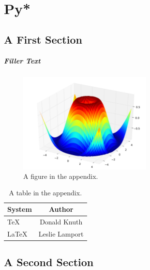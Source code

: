 \chapter{Py*}
\label{appendix:1}

\section{A First Section}

\paragraph{Filler Text} \lipsum[1-6]
%
\begin{figure}
  \centering
  \includegraphics[width=0.6\textwidth]{Chapter-2/figs/threed}
  \caption{A figure in the appendix.}
  \label{fig:app}
\end{figure}
%
\lipsum[7-10]
\begin{table}
  \caption{A table in the appendix.}
  \label{tab:app}
  \begin{center}
    \begin{tabular}{lc}
      \toprule
      System & Author \\
      \midrule
      \TeX   & Donald Knuth   \\
      \LaTeX & Leslie Lamport \\
      \bottomrule
    \end{tabular}
  \end{center}
\end{table}
%

\section{A Second Section}

\lipsum[14-15]
